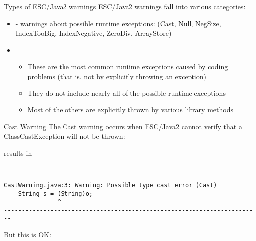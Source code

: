 \documentclass[
pdf,
nocolorBG,
slideColor,
cok,
]{prosper}
\title{\embf{\blue        {\huge ESC/Java2  Warnings    \\ \medskip       {\Large  }}      }}
\author{\embf{\Large{\red David Cok, Joe Kiniry, and Erik Poll}}
       }
\begin{document}
\maketitle \boldmath



\begin{slide}{Types of ESC/Java2 warnings}
\vspace*{-6ex}
ESC/Java2 warnings fall into various categories:
\begin{itemize}
\item[] - warnings about possible {\knalblue runtime exceptions}:
(Cast, Null, NegSize, IndexTooBig, IndexNegative, ZeroDiv, ArrayStore)
\item[]
\begin{itemize}
\item These are the most common runtime exceptions caused by coding problems (that is, not by 
explicitly throwing an exception)
\item They do not include nearly all of the possible runtime exceptions
\item Most of the others are explicitly thrown by various library methods
\end{itemize}
\end{itemize}
\end{slide}

\begin{slide}{Cast Warning}
\vspace*{-9ex}
The Cast warning occurs when ESC/Java2 cannot verify that a ClassCastException will not be thrown:
\begin{figure*}
\tiny

\end{figure*}
results in
{\tiny
\begin{verbatim}
------------------------------------------------------------------------
CastWarning.java:3: Warning: Possible type cast error (Cast)
    String s = (String)o;
               ^
------------------------------------------------------------------------
\end{verbatim}
}
But this is OK:
\begin{figure*}
\tiny

\end{figure*}

\end{slide}
\end{document}
